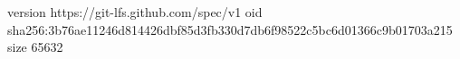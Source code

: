 version https://git-lfs.github.com/spec/v1
oid sha256:3b76ae11246d814426dbf85d3fb330d7db6f98522c5bc6d01366c9b01703a215
size 65632
